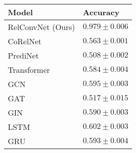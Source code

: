 \begin{tabular}{ll}
\toprule
Model & Accuracy\\
\midrule
RelConvNet (Ours)  &  $0.979 \pm 0.006$ \\
CoRelNet~\citep{kergNeuralArchitecture2022} &  $0.563 \pm 0.001$ \\
PrediNet~\citep{shanahanExplicitlyRelationalNeural} &  $0.508 \pm 0.002$ \\
Transformer~\citep{vaswani2017attention} &  $0.584 \pm 0.004$ \\
GCN~\citep{kipfSemiSupervisedClassificationGraph2017} &  $0.595 \pm 0.003$ \\
GAT~\citep{velickovicGraphAttentionNetworks2017} &  $0.517 \pm 0.015$ \\
GIN~\citep{xuHowPowerfulAre2018} &  $0.590 \pm 0.003$ \\
LSTM~\citep{hochreiterLongShorttermMemory1997}&  $0.602 \pm 0.003$ \\
GRU~\citep{choLearningPhraseRepresentations2014}&  $0.593 \pm 0.004$ \\
\bottomrule
\end{tabular}
